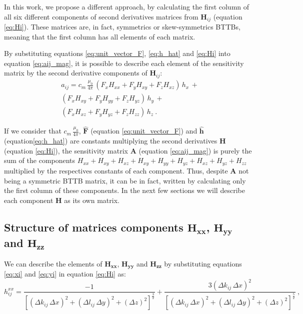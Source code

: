 In this work, we propose a different approach, by calculating the first column of all six different components of second derivatives matrices from $\mathbf{H}_{ij}$ (equation \ref{eq:Hi}). These matrices are, in fact, symmetrics or skew-symmetrics BTTBs, meaning that the first column has all elements of each matrix.

By substituting equations \ref{eq:unit_vector_F}, \ref{eq:h_hat} and \ref{eq:Hi} into equation \ref{eq:aij_mag}, it is possible to describe each element of the sensitivity matrix by the second derivative components of $\mathbf{H}_{ij}$:
\begin{equation}
\begin{split}
a_{ij} = c_{m} \, \frac{\mu_{0}}{4\pi} \, (F_x H_{xx} + F_y H_{xy} + F_z H_{xz}) \, h_x  \, + \\
(F_x H_{xy} + F_y H_{yy} + F_z H_{yz}) \, h_y  \, + \\
(F_x H_{xz} + F_y H_{yz} + F_z H_{zz}) \, h_z \: .
\end{split}
\label{eq:aij_mag_expand}
\end{equation}

If we consider that $c_{m} \, \frac{\mu_{0}}{4\pi}$, $\hat{\mathbf{F}}$ (equation \ref{eq:unit_vector_F}) and $\hat{\mathbf{h}}$ (equation\ref{eq:h_hat}) are constants multiplying the second derivatives $\mathbf{H}$ (equation \ref{eq:Hi}), the sensitivity matrix $\mathbf{A}$ (equation \ref{eq:aij_mag}) is purely the sum of the components $H_{xx} + H_{xy} + H_{xz} + H_{xy} + H_{yy} + H_{yz} + H_{xz} + H_{yz} + H_{zz}$ multiplied by the respectives constants of each component. Thus, despite $\mathbf{A}$ not being a symmetric BTTB matrix, it can be in fact, written by calculating only the first column of these components.
In the next few sections we will describe each component $\mathbf{H}$ as its own matrix.

\subsection{Structure of matrices components $\mathbf{H_{xx}}$, $\mathbf{H_{yy}}$ and $\mathbf{H_{zz}}$}

We can describe the elements of $\mathbf{H_{xx}}$, $\mathbf{H_{yy}}$ and $\mathbf{H_{zz}}$ by substituting equations \ref{eq:xi} and \ref{eq:yi} in equation \ref{eq:Hi}  as:
\begin{equation}
h^{xx}_{ij} = \frac{-1}{ \left[ 
		\left( \Delta k_{ij} \, \Delta x \right)^{2} + 
		\left( \Delta l_{ij} \, \Delta y \right)^{2} + 
		\left( \Delta z \right)^{2} \right]^{\frac{3}{2}}} + 
		\frac{3 (\Delta k_{ij} \, \Delta x )^{2}}{\left[ 
		\left( \Delta k_{ij} \, \Delta x \right)^{2} + 
		\left( \Delta l_{ij} \, \Delta y \right)^{2} + 
		\left( \Delta z \right)^{2} \right]^{\frac{5}{2}}} \: ,
\label{eq:hxx_mag}
\end{equation}

